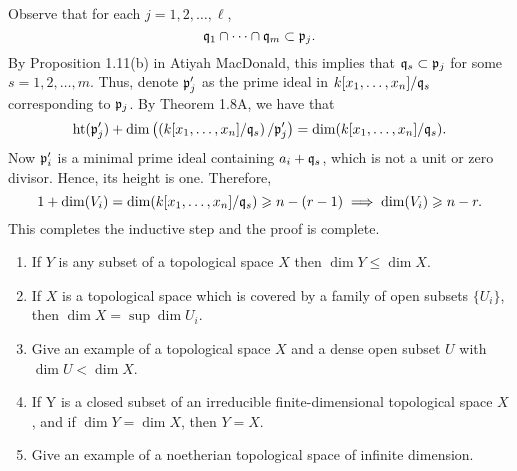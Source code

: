 \documentclass[10pt]{amsart}
\begin{document}
\begin{solution}
\begin{luke}
\begin{description}
        Observe that for each $j = 1, 2, \dots, {\ell}$, 
        \[
            \mathfrak{q}_1 \cap \cdots \cap \mathfrak{q}_{m} \subset \mathfrak{p}_j.
        \]
        By Proposition 1.11(b) in Atiyah MacDonald, this implies that 
        $\mathfrak{q}_s \subset \mathfrak{p}_j$ for some $s = 1, 2, \dots, m$. 
        Thus, denote $\mathfrak{p}'_j$ as the prime ideal in $k[x_1, \dots, x_n]/\mathfrak{q}_s$ 
        corresponding to $\mathfrak{p}_j$. 
        By Theorem 1.8A, we have that 
        \[
            \operatorname{\rm{ht}}(\mathfrak{p}'_j) + \operatorname{\rm{dim}}\left( \left(k[x_1, \dots, x_n]/\mathfrak{q}_s\right)/\mathfrak{p}'_j \right)
            =
            \operatorname{\rm{dim}}(k[x_1, \dots, x_n]/\mathfrak{q}_s).
        \]
        Now $\mathfrak{p}'_i$ is a minimal prime ideal containing $a_i + \mathfrak{q}_s$, which is not a unit
        or zero divisor. Hence, its height is one. Therefore, 
        \[
            1 + \operatorname{\rm{dim}}(V_i) = \operatorname{\rm{dim}}(k[x_1, \dots, x_n]/\mathfrak{q}_s) \geqslant n - (r - 1)
            \implies 
            \operatorname{\rm{dim}}(V_i) \geqslant n - r.
        \]
        This completes the inductive step and the proof is complete. 
    \end{description}
    \end{luke}
\end{solution}

\begin{exercise}[1.10]
    \begin{enumerate}
        \item If $Y$ is any subset of a topological space $X$ then $\dim Y \leq \dim X$. 
        \item If $X$ is a topological space which is covered by a family of open
          subsets $\{U_{i}\}$, then $\dim X = \sup \dim U_i$.
        \item Give an example of a topological space $X$ and a dense open subset $U$
          with $\dim U < \dim X$. 
        \item If Y is a closed subset of an irreducible finite-dimensional topological space $X$, and if $\dim Y = \dim X$, then $Y= X$. 
        \item Give an example of a noetherian topological space of infinite dimension.  
    \end{enumerate}
\end{exercise}
\end{document}
